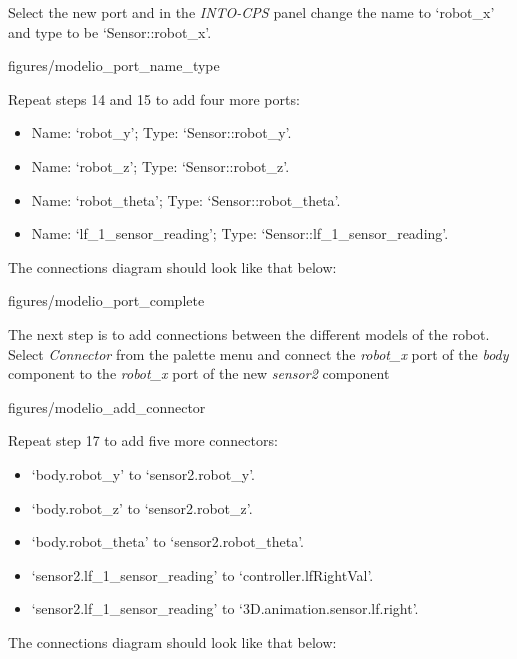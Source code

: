 \documentclass[11pt,a4paper]{../tutorial}
\begin{document}
\begin{instructions}
\item Select the new port and in the \emph{INTO-CPS} panel change the name to `robot\_x' and type to be `Sensor::robot\_x'.

\begin{annotation}[width=0.55\linewidth,trim=180 0 0 750,clip]{figures/modelio_port_name_type}
    \end{annotation}

\item Repeat steps 14 and 15 to add four more ports:
\begin{itemize}
	\item Name: `robot\_y'; Type: `Sensor::robot\_y'.
	\item Name: `robot\_z'; Type: `Sensor::robot\_z'.
	\item Name: `robot\_theta'; Type: `Sensor::robot\_theta'.
	\item Name: `lf\_1\_sensor\_reading'; Type: `Sensor::lf\_1\_sensor\_reading'.
\end{itemize}
The connections diagram should look like that below:

\begin{annotation}[width=0.7\linewidth,trim=0 400 0 0,clip]{figures/modelio_port_complete}
    \end{annotation}
\newpage

\item The next step is to add connections between the different models of the robot. Select \emph{Connector} from the palette menu and connect the \emph{robot\_x} port of the \emph{body} component to the \emph{robot\_x} port of the new \emph{sensor2} component

\begin{annotation}[width=0.55\linewidth,trim=0 400 0 0,clip]{figures/modelio_add_connector}
    \end{annotation}


\item Repeat step 17 to add five more connectors:
\begin{itemize}
	\item `body.robot\_y' to `sensor2.robot\_y'.
	\item `body.robot\_z' to `sensor2.robot\_z'.
	\item `body.robot\_theta' to `sensor2.robot\_theta'.
	\item `sensor2.lf\_1\_sensor\_reading' to `controller.lfRightVal'.
	\item `sensor2.lf\_1\_sensor\_reading' to `3D.animation.sensor.lf.right'.
\end{itemize}
The connections diagram should look like that below:


\end{instructions}
\end{document}
